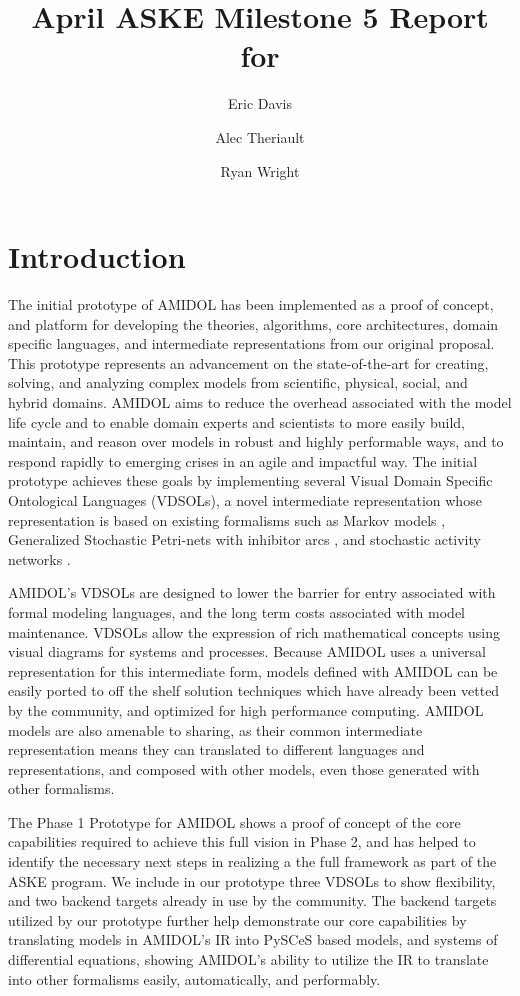 \documentclass[11pt]{article}
\date{\vspace{-5ex}}
\author[1]{Eric Davis}
\author[1]{Alec Theriault}
\author[1]{Ryan Wright}
\affil[1]{Galois, Inc}
\title{April ASKE Milestone 5 Report for \amidol{}}
\newcommand{\amidol}{\textsc{AMIDOL}}
\begin{document}
\maketitle
\vspace{10pt}

\section{Introduction}

The initial prototype of \amidol{} has been implemented as a proof of
concept, and platform for developing the theories, algorithms, core
architectures, domain specific languages, and intermediate
representations from our original proposal.  This prototype represents
an advancement on the state-of-the-art for creating, solving, and
analyzing complex models from scientific, physical, social, and hybrid
domains.  \amidol{} aims to reduce the overhead associated with the
model life cycle and to enable domain experts and scientists to more
easily build, maintain, and reason over models in robust and highly
performable ways, and to respond rapidly to emerging crises in an
agile and impactful way.  The initial prototype achieves these goals
by implementing several Visual Domain Specific Ontological Languages
(VDSOLs), a novel intermediate representation whose representation is
based on existing formalisms such as Markov models
\cite{howard2012dynamic}, Generalized Stochastic Petri-nets with
inhibitor arcs \cite{chiola1993generalized}, and stochastic activity
networks \cite{movaghar1985performability,sanders2000stochastic}.

\amidol{}'s VDSOLs are designed to lower the barrier for entry
associated with formal modeling languages, and the long term costs
associated with model maintenance.  VDSOLs allow the expression of
rich mathematical concepts using visual diagrams for systems and
processes.  Because \amidol{} uses a universal representation for this
intermediate form, models defined with \amidol{} can be easily ported
to off the shelf solution techniques which have already been vetted by
the community, and optimized for high performance computing.
\amidol{} models are also amenable to sharing, as their common
intermediate representation means they can translated to different
languages and representations, and composed with other models, even
those generated with other formalisms.

The Phase 1 Prototype for \amidol{} shows a proof of concept of the
core capabilities required to achieve this full vision in Phase 2, and
has helped to identify the necessary next steps in realizing a the
full framework as part of the ASKE program.  We include in our
prototype three VDSOLs to show flexibility, and two backend targets
already in use by the community.  The backend targets utilized by our
prototype further help demonstrate our core capabilities by
translating models in \amidol{}'s IR into PySCeS based models, and
systems of differential equations, showing \amidol{}'s ability to
utilize the IR to translate into other formalisms easily,
automatically, and performably.
\end{document}
